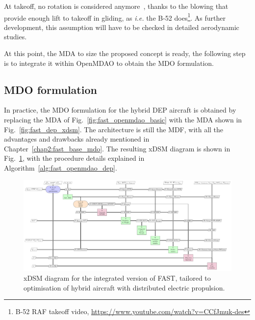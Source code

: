 At takeoff, no rotation is considered anymore~\cite{bib:phillips, bib:anderson_perfo}, thanks to the blowing that provide enough lift to takeoff in gliding, as \textit{i.e.} the B-52 does\footnote{B-52 RAF takeoff video, \url{https://www.youtube.com/watch?v=CCfJmuk-des}}.
As further development, this assumption will have to be checked in detailed aerodynamic studies. 

At this point, the MDA to size the proposed concept is ready, the following step is to integrate it within OpenMDAO to obtain the MDO formulation. 

\subsection{MDO formulation}
\label{subsec:chap3_mdo_hybrid}

In practice, the MDO formulation for the hybrid DEP aircraft is obtained by replacing the MDA of Fig.~\ref{fig:fast_openmdao_basic} with the MDA shown in Fig.~\ref{fig:fast_dep_xdsm}. 
The architecture is still the MDF, with all the advantages and drawbacks already mentioned in Chapter~\ref{chap2:fast_base_mdo}. 
The resulting xDSM diagram is shown in Fig.~\ref{fig:fast_openmdao_dep}, with the procedure details explained in Algorithm~\ref{alg:fast_openmdao_dep}.
\begin{figure}[!h]
	\centering
	\includegraphics[keepaspectratio, width=1.3\textwidth, angle=90]{images/chap3/FAST_OpenMDAO_DEP}
	\caption{xDSM diagram for the integrated version of FAST, tailored to optimisation of hybrid aircraft with distributed electric propulsion.}
	\label{fig:fast_openmdao_dep}
\end{figure}
